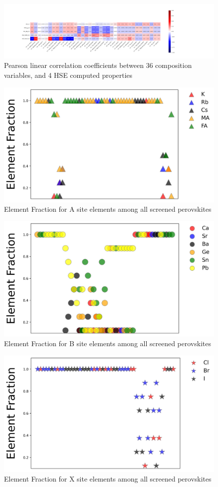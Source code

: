 \documentclass[twoside, twocolumn, 9pt, draft]{article}
\begin{document}
\begin{figure}
\centering
\includegraphics[width=.9\linewidth]{HSE_v_site_prop_pearson.png}
\caption{\label{fig:pearson_hsite} Pearson linear correlation coefficients between 36 composition variables, and 4 HSE computed properties}
\end{figure}


\begin{figure}
\centering
\includegraphics[width=.9\linewidth]{Element_AFrac.jpg}
\caption{\label{fig:pearson_hsite} Element Fraction for A site elements among all screened perovskites}
\end{figure}

\begin{figure}
\centering
\includegraphics[width=.9\linewidth]{Element_BFrac.jpg}
\caption{\label{fig:pearson_hsite}  Element Fraction for B site elements among all screened perovskites}
\end{figure}

\begin{figure}
\centering
\includegraphics[width=.9\linewidth]{Element_XFrac.jpg}
\caption{\label{fig:pearson_hsite} Element Fraction for X site elements among all screened perovskites}
\end{figure}
\end{document}

